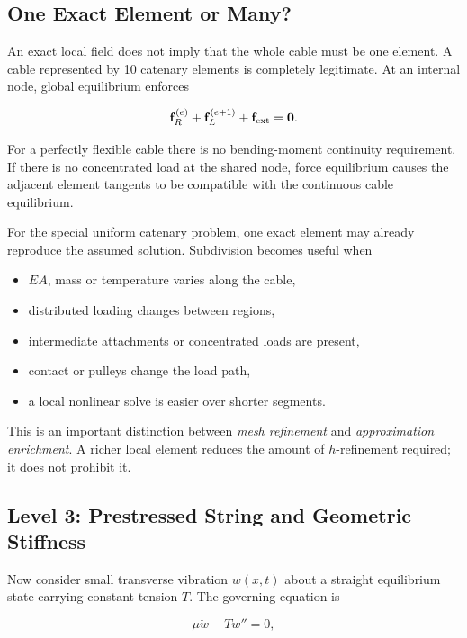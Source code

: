 \subsection{One Exact Element or Many?}

An exact local field does not imply that the whole cable must be one element.
A cable represented by 10 catenary elements is completely legitimate.  At an
internal node, global equilibrium enforces

\begin{equation}
    \mathbf{f}^{(e)}_{R}+\mathbf{f}^{(e+1)}_{L}+\mathbf{f}_{\mathrm{ext}}=\mathbf{0}.
\end{equation}

For a perfectly flexible cable there is no bending-moment continuity
requirement.  If there is no concentrated load at the shared node, force
equilibrium causes the adjacent element tangents to be compatible with the
continuous cable equilibrium.

For the special uniform catenary problem, one exact element may already
reproduce the assumed solution.  Subdivision becomes useful when

\begin{itemize}
    \item $EA$, mass or temperature varies along the cable,
    \item distributed loading changes between regions,
    \item intermediate attachments or concentrated loads are present,
    \item contact or pulleys change the load path,
    \item a local nonlinear solve is easier over shorter segments.
\end{itemize}

This is an important distinction between \emph{mesh refinement} and
\emph{approximation enrichment}.  A richer local element reduces the amount of
$h$-refinement required; it does not prohibit it.

\subsection{Level 3: Prestressed String and Geometric Stiffness}

Now consider small transverse vibration $w(x,t)$ about a straight equilibrium
state carrying constant tension $T$.  The governing equation is

\begin{equation}\label{eq:string-pde}
    \mu\ddot{w}-T w''=0,
\end{equation}

